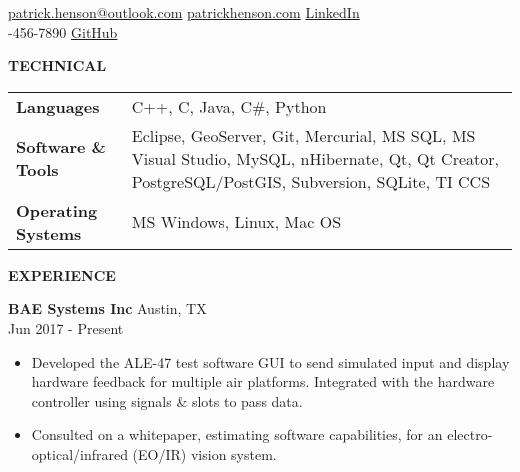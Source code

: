 \documentclass[10pt]{article}
\newcommand{\verticalspace}{\vspace{1.5mm}}
\newcommand{\horizontalrule}{\noindent\hrulefill}
\newcommand{\heading}{\noindent\Large\bf} %
\newcommand{\headingspace}{\vspace{5mm}}
\begin{document}
\renewcommand\familydefault{\sfdefault}



\hfill

\horizontalrule

\noindent 
\href{mailto:fullname@email.com}{patrick.henson@outlook.com}
\hfill
\href{https://patrickhenson.com}{patrickhenson.com}
\hfill
\href{linkedin.com/in/patrickhenson}{LinkedIn}
\\
-456-7890
\hfill
\href{https://github.com/PatrickHenson}{GitHub}

\headingspace
{\heading TECHNICAL}

\verticalspace

\begin{tabular}{@{} p{.2\linewidth} p{.75\linewidth}}

{\bf Languages} & C++, C, Java, C\#, Python \\

{\bf Software \& Tools} & Eclipse, GeoServer, Git, Mercurial, MS SQL, MS Visual Studio, MySQL, nHibernate, Qt, Qt Creator, PostgreSQL/PostGIS, Subversion, SQLite, TI CCS \\

{\bf Operating Systems} & MS Windows, Linux, Mac OS

\end{tabular}

{\heading EXPERIENCE}

\verticalspace

{\bf BAE Systems Inc} \hfill Austin, TX \\
 \hfill Jun 2017 - Present
\begin{itemize}
\item Developed the ALE-47 test software GUI to send simulated input and display hardware feedback for multiple air platforms.  Integrated with the hardware controller using signals \& slots to pass data.
\item Consulted on a whitepaper, estimating software capabilities, for an electro-optical/infrared (EO/IR) vision system.
\end{itemize}
\end{document}

